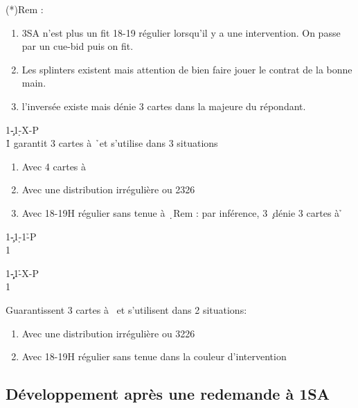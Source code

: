 \documentclass[a4paper]{article}
\begin{document}
(*)Rem :

\begin{enumerate}
\item 3SA n’est plus un fit 18-19 régulier lorsqu’il y a une intervention. On passe
par un cue-bid puis on fit.

\item Les splinters existent mais attention de bien faire jouer le contrat de la 
bonne main.

\item l’inversée existe mais dénie 3 cartes dans la majeure du répondant.

\end{enumerate}

\begin{bidtable}
1\c-1\d-X-P\\
1\h \> garantit 3 cartes à \h\ et s’utilise dans 3 situations
\end{bidtable}

\begin{enumerate}
\item Avec 4 cartes à \s\ 

\item Avec une distribution irrégulière ou 2326

\item Avec 18-19H régulier sans tenue à \d\ 
Rem : par inférence, 3 \c\ dénie 3 cartes à \h 

\end{enumerate}

\begin{bidtable}
1\c-1\d-1\h-P\\
1\s
\end{bidtable}

\begin{bidtable}
1\c\d-1\h-X-P\\
1\s
\end{bidtable}

Guarantissent 3 cartes à \s\ et s’utilisent dans 2 situations:

\begin{enumerate}
\item Avec une distribution irrégulière ou 3226

\item Avec 18-19H régulier sans tenue dans la couleur d’intervention

\end{enumerate}

\subsection{Développement après une redemande à 1SA}
\end{document}
